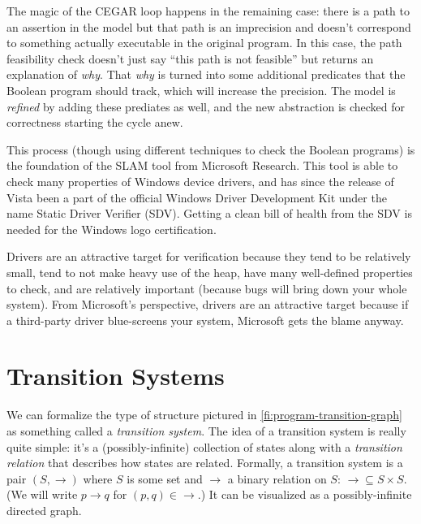 \documentclass{article}
\newenvironment{sidebar}{}{}
\begin{document}
\begin{sidebar}
The magic of the CEGAR loop happens in the remaining case: there is a
path to an assertion in the model but that path is an imprecision and
doesn't correspond to something actually executable in the original
program. In this case, the path feasibility check doesn't just say
``this path is not feasible'' but returns an explanation of
\emph{why}. That \emph{why} is turned into some additional predicates
that the Boolean program should track, which will increase the
precision. The model is \emph{refined} by adding these prediates as
well, and the new abstraction is checked for correctness starting the
cycle anew.

This process (though using different techniques to check the Boolean
programs) is the foundation of the SLAM tool from Microsoft
Research. This tool is able to check many properties of Windows device
drivers, and has since the release of Vista been a part of the
official Windows Driver Development Kit under the name Static Driver
Verifier (SDV). Getting a clean bill of health from the SDV is needed
for the Windows logo certification. 

Drivers are an attractive target for verification because they tend to
be relatively small, tend to not make heavy use of the heap, have many
well-defined properties to check, and are relatively important
(because bugs will bring down your whole system). From Microsoft's
perspective, drivers are an attractive target because if a third-party
driver blue-screens your system, Microsoft gets the blame anyway.
\end{sidebar}


\section{Transition Systems}
We can formalize the type of structure pictured in
\cref{fi:program-transition-graph} as something called a \emph{transition
  system}. The idea of a transition system is really quite simple:
it's a (possibly-infinite) collection of states along with a
\emph{transition relation} that describes how states are
related. Formally, a transition system is a pair $(S, \rightarrow)$
where $S$ is some set and $\rightarrow$ a binary relation on $S$:
$\rightarrow \subseteq S \times S$. (We will write $p \rightarrow q$
for $(p, q) \in \rightarrow$.) It can be visualized as a
possibly-infinite directed graph.
\end{document}
